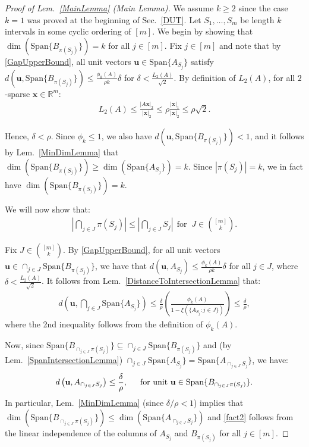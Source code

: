 \documentclass[journal, twocolumn]{IEEEtran}
\begin{document}
\begin{proof}[Proof of Lem.~\ref{MainLemma} (Main Lemma)]
We assume $k \geq 2$ since the case $k = 1$ was proved at the beginning of Sec.~\ref{DUT}. Let $S_1, \ldots, S_m$ be length $k$ intervals in some cyclic ordering of $[m]$. We begin by showing that $\dim(\text{Span}\{B_{\pi(S_j)}\}) = k$ for all $j \in [m]$. 
Fix $j \in [m]$ and note that by \eqref{GapUpperBound}, all unit vectors $\mathbf{u} \in \text{Span}\{A_{S_j}\}$ satisfy $d(\mathbf{u}, \text{Span}\{B_{\pi(S_j)}\}) \leq \frac{\phi_k(A)}{\rho k} \delta$ for $\delta < \frac{L_2(A)}{ \sqrt{2}}$. By definition of $L_2(A)$, for all $2$-sparse $\mathbf{x} \in \mathbb{R}^m$:
\begin{align*}
L_2(A) \leq \frac{|A\mathbf{x}|_2}{|\mathbf{x}|_2} \leq \rho \frac{|\mathbf{x}|_1}{|\mathbf{x}|_2} \leq \rho \sqrt{2}.
\end{align*}

Hence, $\delta < \rho$. Since $\phi_k \leq 1$, we also have $d(\mathbf{u}, \text{Span}\{B_{\pi(S_j)}\}) < 1$, and it follows by Lem.~\ref{MinDimLemma} that $\dim(\text{Span}\{B_{\pi(S_j)}\}) \geq \dim(\text{Span}\{A_{S_j}\}) = k$. Since $|\pi(S_j)| = k$, we in fact have $\dim(\text{Span}\{B_{\pi(S_j)}\}) = k$. %

We will now show that:
\begin{align}\label{fact2}
|\bigcap_{j \in J} \pi(S_j)| \leq |\bigcap_{j \in J} S_j | \ \ \text{for } \ J \in {[m] \choose k}.
\end{align}

Fix $J \in {[m] \choose k}$. By \eqref{GapUpperBound}, for all unit vectors \mbox{$\mathbf{u} \in \cap_{j \in J} \text{Span}\{B_{\pi(S_j)}\}$}, we have  that $d(\mathbf{u}, A_{S_j}) \leq \frac{\phi_k(A)}{\rho k} \delta$ for all $j \in J$, where $\delta < \frac{L_2(A)}{\sqrt{2}}$. It follows from Lem.~\ref{DistanceToIntersectionLemma} that:
\begin{align*}
d\left( \mathbf{u}, \bigcap_{j \in J} \text{Span}\{A_{S_j}\} \right) 
\leq \frac{\delta}{\rho} \left( \frac{ \phi_k(A) }{1 - \xi( \{ A_{S_j}: j \in J\} ) } \right) \leq \frac{\delta}{\rho},
\end{align*}
%
where the 2nd inequality follows from the definition of $\phi_k(A)$. 

Now, since \mbox{$\text{Span}\{B_{\cap_{j \in J}\pi(S_j)}\} \subseteq \cap_{j \in J} \text{Span}\{B_{\pi(S_j)}\}$} and (by Lem.~\ref{SpanIntersectionLemma}) $\cap_{j \in J}  \text{Span}\{A_{S_j}\} = \text{Span}\{A_{\cap_{j \in J}  S_j}\}$, we have:
\begin{align}\label{fact1}
d\left( \mathbf{u}, A_{\cap_{j \in J} S_j} \right) \leq \frac{\delta}{\rho}, \indent \text{for unit } \mathbf{u} \in \text{Span}\{B_{\cap_{j \in J}\pi(S_j)}\}.
\end{align}
In particular, Lem.~\ref{MinDimLemma} (since $\delta/\rho < 1$) implies that $\dim(\text{Span}\{B_{\cap_{j \in J}\pi(S_j)}\}) \leq \dim(\text{Span}\{A_{\cap_{j \in J} S_j}\})$ and \eqref{fact2} follows from the linear independence of the columns of $A_{S_j}$ and $B_{\pi(S_j)}$ for all $j \in [m]$.


\end{proof}
\end{document}
